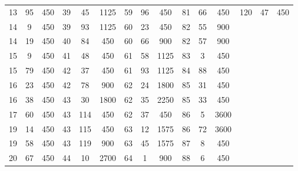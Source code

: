 \begin{center}
\begin{tabular}{|c|c|c||c|c|c||c|c|c||c|c|c||c|c|c|}
        13         & 95         & 450        & 39         & 45         & 1125       & 59         & 96         & 450        & 81         & 66         & 450        & 120        & 47         & 450        \\
        14         & 9          & 450        & 39         & 93         & 1125       & 60         & 23         & 450        & 82         & 55         & 900        &            &            &            \\
        14         & 19         & 450        & 40         & 84         & 450        & 60         & 66         & 900        & 82         & 57         & 900        &            &            &            \\
        15         & 9          & 450        & 41         & 48         & 450        & 61         & 58         & 1125       & 83         & 3          & 450        &            &            &            \\
        15         & 79         & 450        & 42         & 37         & 450        & 61         & 93         & 1125       & 84         & 88         & 450        &            &            &            \\
        16         & 23         & 450        & 42         & 78         & 900        & 62         & 24         & 1800       & 85         & 31         & 450        &            &            &            \\
        16         & 38         & 450        & 43         & 30         & 1800       & 62         & 35         & 2250       & 85         & 33         & 450        &            &            &            \\
        17         & 60         & 450        & 43         & 114        & 450        & 62         & 37         & 450        & 86         & 5          & 3600       &            &            &            \\
        19         & 14         & 450        & 43         & 115        & 450        & 63         & 12         & 1575       & 86         & 72         & 3600       &            &            &            \\
        19         & 58         & 450        & 43         & 119        & 900        & 63         & 45         & 1575       & 87         & 8          & 450        &            &            &            \\
        20         & 67         & 450        & 44         & 10         & 2700       & 64         & 1          & 900        & 88         & 6          & 450        &            &            &            \\

\end{tabular}
\end{center}
